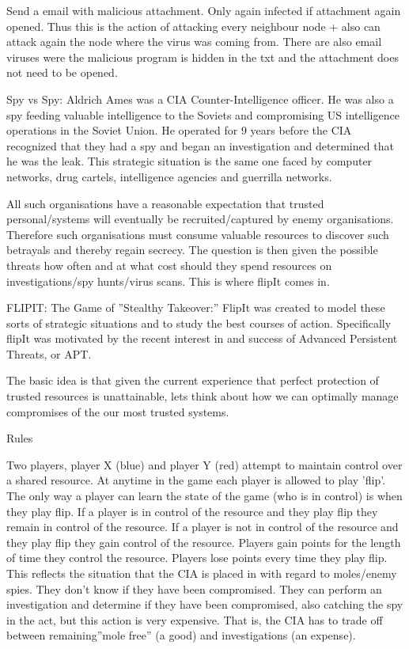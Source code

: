 Send a email with malicious attachment. Only again infected if attachment again opened. Thus this is the action of attacking every neighbour node + also can attack again the node where the virus was coming from.
There are also email viruses were the malicious program is hidden in the txt and the attachment does not need to be opened. 


Spy vs Spy: Aldrich Ames was a CIA Counter-Intelligence officer. He was also a spy feeding valuable intelligence to the Soviets and compromising US intelligence operations in the Soviet Union. He operated for 9 years before the CIA recognized that they had a spy and began an investigation and determined that he was the leak. This strategic situation is the same one faced by computer networks, drug cartels, intelligence agencies and guerrilla networks.

All such organisations have a reasonable expectation that trusted personal/systems will eventually be recruited/captured by enemy organisations. Therefore such organisations must consume valuable resources to discover such betrayals and thereby regain secrecy. The question is then given the possible threats how often and at what cost should they spend resources on investigations/spy hunts/virus scans. This is where flipIt comes in.

FLIPIT: The Game of ''Stealthy Takeover:'' FlipIt was created to model these sorts of strategic situations and to study the best courses of action. Specifically flipIt was motivated by the recent interest in and success of Advanced Persistent Threats, or APT.

The basic idea is that given the current experience that perfect protection of trusted resources is unattainable, lets think about how we can optimally manage compromises of the our most trusted systems.

Rules

Two players, player X (blue) and player Y (red) attempt to maintain control over a shared resource.
At anytime in the game each player is allowed to play 'flip'.
The only way a player can learn the state of the game (who is in control) is when they play flip.
If a player is in control of the resource and they play flip they remain in control of the resource.
If a player is not in control of the resource and they play flip they gain control of the resource.
Players gain points for the length of time they control the resource.
Players lose points every time they play flip.
This reflects the situation that the CIA is placed in with regard to moles/enemy spies. They don't know if they have been compromised. They can perform an investigation and determine if they have been compromised, also catching the spy in the act, but this action is very expensive. That is, the CIA has to trade off between remaining''mole free'' (a good) and investigations (an expense).


